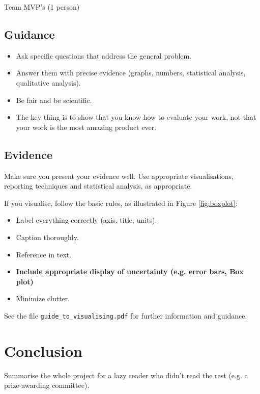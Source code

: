 \documentclass{l4proj}
\begin{document}
Team MVP's (1 person)









\section{Guidance}
\begin{itemize}
    \item
        Ask specific questions that address the general problem.
    \item
        Answer them with precise evidence (graphs, numbers, statistical
        analysis, qualitative analysis).
    \item
        Be fair and be scientific.
    \item
        The key thing is to show that you know how to evaluate your work, not
        that your work is the most amazing product ever.
\end{itemize}

\section{Evidence}
Make sure you present your evidence well. Use appropriate visualisations, reporting techniques and statistical analysis, as appropriate.

If you visualise, follow the basic rules, as illustrated in Figure \ref{fig:boxplot}:
\begin{itemize}
\item Label everything correctly (axis, title, units).
\item Caption thoroughly.
\item Reference in text.
\item \textbf{Include appropriate display of uncertainty (e.g. error bars, Box plot)}
\item Minimize clutter.
\end{itemize}

See the file \texttt{guide\_to\_visualising.pdf} for further information and guidance.



\chapter{Conclusion}    
Summarise the whole project for a lazy reader who didn't read the rest (e.g. a prize-awarding committee).
\end{document}
